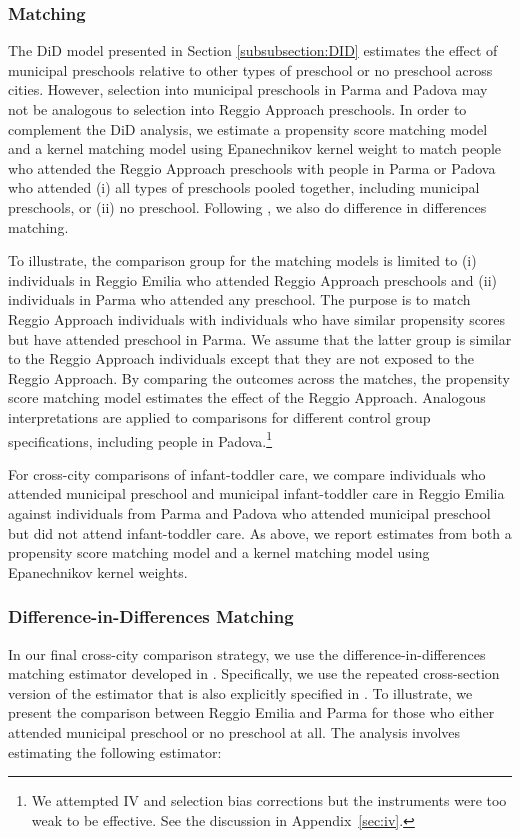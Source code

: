 \subsubsection{Matching}

The DiD model presented in Section \ref{subsubsection:DID} estimates the effect of municipal preschools relative to other types of preschool or no preschool across cities. However, selection into municipal preschools in Parma and Padova may not be analogous to selection into Reggio Approach preschools. In order to complement the DiD analysis, we estimate a propensity score matching model and a kernel matching model using Epanechnikov kernel weight to match people who attended the Reggio Approach preschools with people in Parma or Padova who attended (i) all types of preschools pooled together, including municipal preschools, or (ii) no preschool. Following \cite{Heckman_Ichimura_etal_1998_Econometrica}, we also do difference in differences matching.

To illustrate, the comparison group for the matching models is limited to (i) individuals in Reggio Emilia who attended Reggio Approach preschools and (ii) individuals in Parma who attended any preschool. The purpose is to match Reggio Approach individuals with individuals who have similar propensity scores but have attended preschool in Parma. We assume that the latter group is similar to the Reggio Approach individuals except that they are not exposed to the Reggio Approach. By comparing the outcomes across the matches, the propensity score matching model estimates the effect of the Reggio Approach. Analogous interpretations are applied to comparisons for different control group specifications, including people in Padova.\footnote{We attempted IV and selection bias corrections but the instruments were too weak to be effective. See the discussion in Appendix~\ref{sec:iv}.}

For cross-city comparisons of infant-toddler care, we compare individuals who attended municipal preschool and municipal infant-toddler care in Reggio Emilia against individuals from Parma and Padova who attended municipal preschool but did not attend infant-toddler care. As above, we report estimates from both a propensity score matching model and a kernel matching model using Epanechnikov kernel weights.

\subsubsection{Difference-in-Differences Matching} \label{subsubsection:matchedDID}
In our final cross-city comparison strategy, we use the difference-in-differences matching estimator developed in \cite{Heckman_Ichimura_etal_1998_Econometrica}. Specifically, we use the repeated cross-section version of the estimator that is also explicitly specified in \cite{Smith_Todd_2005_JOE}. To illustrate, we present the comparison between Reggio Emilia and Parma for those who either attended municipal preschool or no preschool at all. The analysis involves estimating the following estimator:

